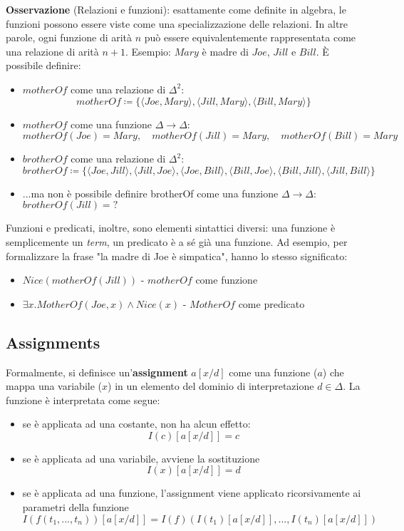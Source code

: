 \textbf{Osservazione} (Relazioni e funzioni): esattamente come definite in algebra, le funzioni possono essere viste come una specializzazione delle relazioni. In altre parole, ogni funzione di arità $n$ può essere equivalentemente rappresentata come una relazione di arità $n+1$. Esempio: $Mary$ è madre di $Joe$, $Jill$ e $Bill$. È possibile definire:
\begin{itemize}
\item $motherOf$ come una relazione di $\Delta^2$:
$$motherOf \coloneqq \lbrace \langle Joe, Mary \rangle, \langle Jill, Mary \rangle, \langle Bill, Mary \rangle \rbrace$$
\item $motherOf$ come una funzione $\Delta \to \Delta$: $$motherOf(Joe) = Mary, \quad motherOf(Jill) = Mary,\quad motherOf(Bill) = Mary$$
\item $brotherOf$ come una relazione di $\Delta^2$: $$brotherOf \coloneqq \lbrace \langle Joe, Jill \rangle, \langle Jill, Joe \rangle, \langle Joe, Bill \rangle , \langle Bill, Joe \rangle, \langle Bill, Jill \rangle, \langle Jill, Bill \rangle \rbrace$$
\item ...ma non è possibile definire brotherOf come una funzione $\Delta \to \Delta$: $brotherOf(Jill) = ?$
\end{itemize}

\vspace{1em}
Funzioni e predicati, inoltre, sono elementi sintattici diversi: una funzione è semplicemente un \textit{term}, un predicato è a sé già una funzione. Ad esempio, per formalizzare la frase "la madre di Joe è simpatica", hanno lo stesso significato:
\begin{itemize}
\item $Nice(motherOf(Jill))$ - $motherOf$ come funzione
\item $\exists x. MotherOf(Joe, x) \land Nice(x) $ - $MotherOf$ come predicato
\end{itemize}

\subsection{Assignments}
Formalmente, si definisce un'\textbf{assignment} $a[x/d]$ come una funzione ($a$) che mappa una variabile ($x$) in un elemento del dominio di interpretazione $d \in \Delta$. La funzione è interpretata come segue:
\begin{itemize}
\item se è applicata ad una costante, non ha alcun effetto: $$I(c)[a[x/d]] = c$$
\item se è applicata ad una variabile, avviene la sostituzione $$I(x)[a[x/d]] = d$$
\item se è applicata ad una funzione, l'assignment viene applicato ricorsivamente ai parametri della funzione $$I(f(t_1, ..., t_n))[a[x/d]] = I(f)(I(t_1)[a[x/d]], ..., I(t_n)[a[x/d]])$$
\end{itemize}

